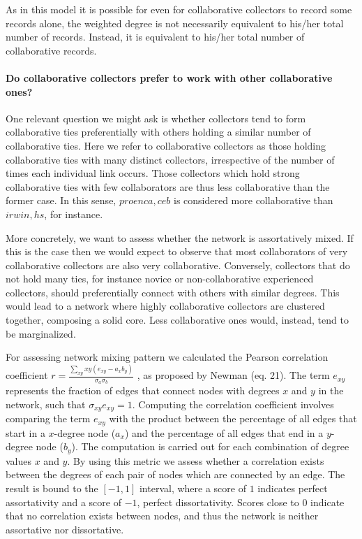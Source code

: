As in this model it is possible for even for collaborative collectors to record some records alone, the weighted degree is not necessarily equivalent to his/her total number of records. Instead, it is equivalent to his/her total number of collaborative records.

\paragraph*{Do collaborative collectors prefer to work with other collaborative ones?}
One relevant question we might ask is whether collectors tend to form collaborative ties preferentially with others holding a similar number of collaborative ties.
Here we refer to collaborative collectors as those holding collaborative ties with many distinct collectors, irrespective of the number of times each individual link occurs. Those collectors which hold strong collaborative ties with few collaborators are thus less collaborative than the former case. In this sense, $proenca,ceb$ is considered more collaborative than $irwin,hs$, for instance.

More concretely, we want to assess whether the network is assortatively mixed.
If this is the case then we would expect to observe that most collaborators of very collaborative collectors are also very collaborative.
Conversely, collectors that do not hold many ties, for instance novice or non-collaborative experienced collectors, should preferentially connect with others with similar degrees.
This would lead to a network where highly collaborative collectors are clustered together, composing a solid core. Less collaborative ones would, instead, tend to be marginalized. %

For assessing network mixing pattern we calculated the Pearson correlation coefficient $r = \frac{\sum_{xy} xy(e_{xy}-a_xb_y)}{\sigma_a \sigma_b}$ , as proposed by Newman \cite{Newman2003c} (eq. 21).
The term $e_{xy}$ represents the fraction of edges that connect nodes with degrees $x$ and $y$ in the network, such that $\sigma_{xy}e_{xy}=1$. 
Computing the correlation coefficient involves comparing the term $e_{xy}$ with the product between the percentage of all edges that start in a $x$-degree node ($a_x$) and the percentage of all edges that end in a $y$-degree node ($b_y$). The computation is carried out for each combination of degree values $x$ and $y$.
By using this metric we assess whether a correlation exists between the degrees of each pair of nodes which are connected by an edge. 
The result is bound to the $[-1,1]$ interval, where a score of $1$ indicates perfect assortativity and a score of $-1$, perfect dissortativity.
Scores close to $0$ indicate that no correlation exists between nodes, and thus the network is neither assortative nor dissortative.

